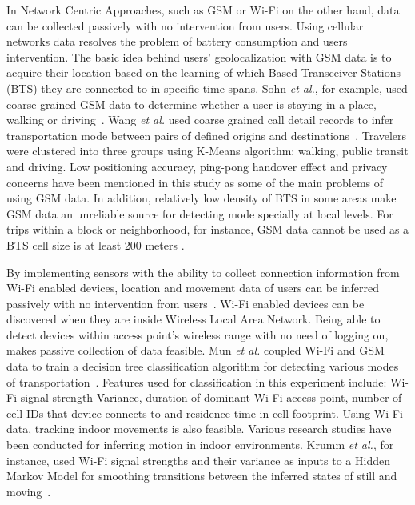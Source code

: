  In Network Centric Approaches, such as GSM or Wi-Fi on the other hand, data can be collected passively with no intervention from users. Using cellular networks data resolves the problem of battery consumption and users intervention. The basic idea behind users' geolocalization with GSM data is to acquire their location based on the learning of which Based Transceiver Stations (BTS) they are connected to in specific time spans. Sohn \textit{et al.}, for example, used coarse grained GSM data to determine whether a user is staying in a place, walking or driving~\cite{sohn2006mobility}.  Wang \textit{et al.} used coarse grained call detail records to infer transportation mode between pairs of defined origins and destinations~\cite{wang2010transportation}. Travelers were clustered into three groups using K-Means algorithm: walking, public transit and driving. Low positioning accuracy, ping-pong handover effect and privacy concerns have been mentioned in this study as some of the main problems of using GSM data. In addition, relatively low density of BTS in some areas make GSM data an unreliable source for detecting mode specially at local levels. For trips within a block or neighborhood, for instance, GSM data cannot be used as a BTS cell size is at least 200 meters \cite{kalatian2016travel}.
 
 By implementing sensors with the ability to collect connection information from  Wi-Fi enabled devices, location and movement data of users can be inferred passively with no intervention from users~\cite{farooq2015ubiquitous}. Wi-Fi enabled devices can be discovered when they are inside Wireless Local Area Network. Being able to detect devices within access point's wireless range with no need of logging on, makes passive collection of data feasible. Mun \textit{et al.} coupled Wi-Fi and GSM data to train a decision tree classification algorithm for detecting various modes of transportation~\cite{mun2008parsimonious}. Features used for classification in this experiment include: Wi-Fi signal strength Variance, duration of dominant Wi-Fi access point, number of cell IDs that device connects to and residence time in cell footprint. Using Wi-Fi data, tracking indoor movements is also feasible. Various research studies have been conducted for inferring motion in indoor environments. Krumm \textit{et al.}, for instance, used Wi-Fi signal strengths and their variance as inputs to a Hidden Markov Model for smoothing transitions between the inferred states of still and moving~\cite{krumm2004locadio}.
 
